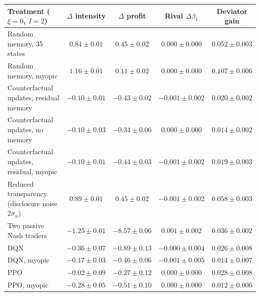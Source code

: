 \begin{tabular}{lcccc}
\toprule
Treatment ($\xi=0$, $I=2$) & $\Delta$ intensity & $\Delta$ profit & Rival $\Delta\beta_1$ & Deviator gain \\
\midrule
Random memory, 35 states & $0.84 \pm 0.01$ & $0.45 \pm 0.02$ & $0.000 \pm 0.000$ & $0.052 \pm 0.003$ \\
Random memory, myopic & $1.16 \pm 0.01$ & $0.11 \pm 0.02$ & $0.000 \pm 0.000$ & $0.107 \pm 0.006$ \\
Counterfactual updates, residual memory & $-0.10 \pm 0.01$ & $-0.43 \pm 0.02$ & $-0.001 \pm 0.002$ & $0.020 \pm 0.002$ \\
Counterfactual updates, no memory & $-0.10 \pm 0.03$ & $-0.34 \pm 0.06$ & $0.000 \pm 0.000$ & $0.014 \pm 0.002$ \\
Counterfactual updates, residual, myopic & $-0.10 \pm 0.01$ & $-0.44 \pm 0.03$ & $-0.001 \pm 0.002$ & $0.019 \pm 0.003$ \\
Reduced transparency (disclosure noise $2\sigma_u$) & $0.89 \pm 0.01$ & $0.45 \pm 0.02$ & $-0.001 \pm 0.002$ & $0.058 \pm 0.003$ \\
Two passive Nash traders & $-1.25 \pm 0.01$ & $-8.57 \pm 0.06$ & $0.001 \pm 0.002$ & $0.036 \pm 0.002$ \\
DQN & $-0.36 \pm 0.07$ & $-0.89 \pm 0.13$ & $-0.000 \pm 0.004$ & $0.026 \pm 0.008$ \\
DQN, myopic & $-0.17 \pm 0.03$ & $-0.46 \pm 0.06$ & $-0.001 \pm 0.005$ & $0.014 \pm 0.007$ \\
PPO & $-0.02 \pm 0.09$ & $-0.27 \pm 0.12$ & $0.000 \pm 0.000$ & $0.028 \pm 0.008$ \\
PPO, myopic & $-0.28 \pm 0.05$ & $-0.51 \pm 0.10$ & $0.000 \pm 0.000$ & $0.012 \pm 0.006$ \\
\bottomrule
\end{tabular}